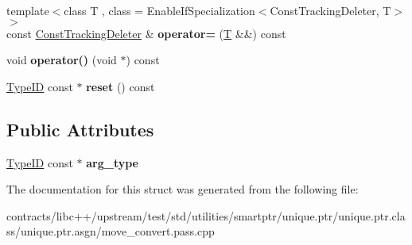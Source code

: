 \begin{DoxyCompactItemize}
\item 
\mbox{\label{struct_const_tracking_deleter_a417195507daaed72fd1d93f85c55affd}} 
{\footnotesize template$<$class T , class  = Enable\+If\+Specialization$<$\+Const\+Tracking\+Deleter, T$>$$>$ }\\const \mbox{\hyperlink{struct_const_tracking_deleter}{Const\+Tracking\+Deleter}} \& {\bfseries operator=} (\mbox{\hyperlink{struct_t}{T}} \&\&) const
\item 
\mbox{\label{struct_const_tracking_deleter_aa194a41c55283d6087c97fd1ee9792e1}} 
void {\bfseries operator()} (void $\ast$) const
\item 
\mbox{\label{struct_const_tracking_deleter_a5aadcf60a585713dea9714f0bae9ab47}} 
\mbox{\hyperlink{struct_type_i_d}{Type\+ID}} const  $\ast$ {\bfseries reset} () const
\end{DoxyCompactItemize}
\subsection*{Public Attributes}
\begin{DoxyCompactItemize}
\item 
\mbox{\label{struct_const_tracking_deleter_a227786da5b6d00bbee5e82f463ac594c}} 
\mbox{\hyperlink{struct_type_i_d}{Type\+ID}} const  $\ast$ {\bfseries arg\+\_\+type}
\end{DoxyCompactItemize}


The documentation for this struct was generated from the following file\+:\begin{DoxyCompactItemize}
\item 
contracts/libc++/upstream/test/std/utilities/smartptr/unique.\+ptr/unique.\+ptr.\+class/unique.\+ptr.\+asgn/move\+\_\+convert.\+pass.\+cpp\end{DoxyCompactItemize}
